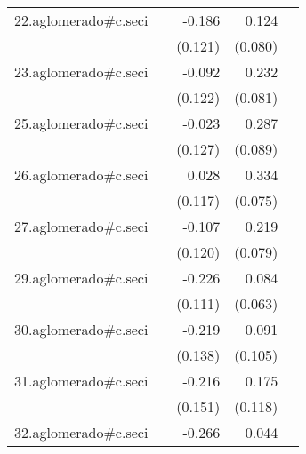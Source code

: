 {\begin{longtable}{l*{4}{D{.}{.}{-1}}}
\addlinespace
22.aglomerado#c.seci&                     &      -0.186         &       0.124         &                     \\
            &                     &     (0.121)         &     (0.080)         &                     \\
\addlinespace
23.aglomerado#c.seci&                     &      -0.092         &       0.232\sym{**} &                     \\
            &                     &     (0.122)         &     (0.081)         &                     \\
\addlinespace
25.aglomerado#c.seci&                     &      -0.023         &       0.287\sym{**} &                     \\
            &                     &     (0.127)         &     (0.089)         &                     \\
\addlinespace
26.aglomerado#c.seci&                     &       0.028         &       0.334\sym{***}&                     \\
            &                     &     (0.117)         &     (0.075)         &                     \\
\addlinespace
27.aglomerado#c.seci&                     &      -0.107         &       0.219\sym{**} &                     \\
            &                     &     (0.120)         &     (0.079)         &                     \\
\addlinespace
29.aglomerado#c.seci&                     &      -0.226\sym{*}  &       0.084         &                     \\
            &                     &     (0.111)         &     (0.063)         &                     \\
\addlinespace
30.aglomerado#c.seci&                     &      -0.219         &       0.091         &                     \\
            &                     &     (0.138)         &     (0.105)         &                     \\
\addlinespace
31.aglomerado#c.seci&                     &      -0.216         &       0.175         &                     \\
            &                     &     (0.151)         &     (0.118)         &                     \\
\addlinespace
32.aglomerado#c.seci&                     &      -0.266\sym{*}  &       0.044         &                     \\

\end{longtable}}
